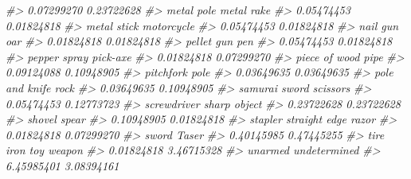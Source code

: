 \documentclass[
  12pt,
]{book}
\newenvironment{Shaded}{\begin{snugshade}}{\end{snugshade}}
\newcommand{\CommentTok}[1]{\textcolor[rgb]{0.37,0.37,0.37}{\textit{#1}}}
\begin{document}
\begin{Shaded}
\begin{Highlighting}[]
\CommentTok{\#>                       0.07299270                       0.23722628 }
\CommentTok{\#>                       metal pole                       metal rake }
\CommentTok{\#>                       0.05474453                       0.01824818 }
\CommentTok{\#>                      metal stick                       motorcycle }
\CommentTok{\#>                       0.05474453                       0.01824818 }
\CommentTok{\#>                         nail gun                              oar }
\CommentTok{\#>                       0.01824818                       0.01824818 }
\CommentTok{\#>                       pellet gun                              pen }
\CommentTok{\#>                       0.05474453                       0.01824818 }
\CommentTok{\#>                     pepper spray                         pick{-}axe }
\CommentTok{\#>                       0.01824818                       0.07299270 }
\CommentTok{\#>                    piece of wood                             pipe }
\CommentTok{\#>                       0.09124088                       0.10948905 }
\CommentTok{\#>                        pitchfork                             pole }
\CommentTok{\#>                       0.03649635                       0.03649635 }
\CommentTok{\#>                   pole and knife                             rock }
\CommentTok{\#>                       0.03649635                       0.10948905 }
\CommentTok{\#>                    samurai sword                         scissors }
\CommentTok{\#>                       0.05474453                       0.12773723 }
\CommentTok{\#>                      screwdriver                     sharp object }
\CommentTok{\#>                       0.23722628                       0.23722628 }
\CommentTok{\#>                           shovel                            spear }
\CommentTok{\#>                       0.10948905                       0.01824818 }
\CommentTok{\#>                          stapler              straight edge razor }
\CommentTok{\#>                       0.01824818                       0.07299270 }
\CommentTok{\#>                            sword                            Taser }
\CommentTok{\#>                       0.40145985                       0.47445255 }
\CommentTok{\#>                        tire iron                       toy weapon }
\CommentTok{\#>                       0.01824818                       3.46715328 }
\CommentTok{\#>                          unarmed                     undetermined }
\CommentTok{\#>                       6.45985401                       3.08394161 }

\end{Highlighting}
\end{Shaded}
\end{document}
